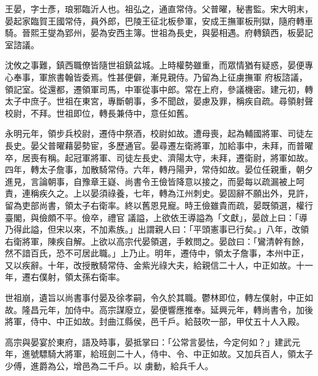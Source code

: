
\begin{pinyinscope}

 王晏，字士彥，琅邪臨沂人也。祖弘之，通直常侍。父普曜，秘書監。宋大明末，晏起家臨賀王國常侍，員外郎，巴陵王征北板參軍，安成王撫軍板刑獄，隨府轉車騎。晉熙王燮為郢州，晏為安西主簿。世祖為長史，與晏相遇。府轉鎮西，板晏記室諮議。



 沈攸之事難，鎮西職僚皆隨世祖鎮盆城。上時權勢雖重，而眾情猶有疑惑，晏便專心奉事，軍旅書翰皆委焉。性甚便僻，漸見親侍。乃留為上征虜撫軍
 府板諮議，領記室。從還都，遷領軍司馬，中軍從事中郎。常在上府，參議機密。建元初，轉太子中庶子。世祖在東宮，專斷朝事，多不聞啟，晏慮及罪，稱疾自疏。尋領射聲校尉，不拜。世祖即位，轉長兼侍中，意任如舊。



 永明元年，領步兵校尉，遷侍中祭酒，校尉如故。遭母喪，起為輔國將軍、司徒左長史。晏父普曜藉晏勢宦，多歷通官。晏尋遷左衛將軍，加給事中，未拜，而普曜卒，居喪有稱。起冠軍將軍、司徒左長史、濟陽太守，未拜，遷衛尉，將軍如故。四年，轉太子詹事，加散騎常侍。六年，轉丹陽尹，常侍如故。晏位任親重，朝夕進見，言論朝事，自豫章王嶷、尚書令王儉皆降意以接之，而晏每以疏漏被上呵責，連稱疾久之。上以晏須祿養，七年，轉為江州刺史。晏固辭不願出外，見許，留為吏部尚書，領太子右衛率。終以舊恩見寵。時王儉雖貴而疏，晏既領選，權行臺閣，與儉頗不平。儉卒，禮官
 議謚，上欲依王導謚為「文獻」，晏啟上曰：「導乃得此謚，但宋以來，不加素族。」出謂親人曰：「平頭憲事已行矣。」八年，改領右衛將軍，陳疾自解。上欲以高宗代晏領選，手敕問之。晏啟曰：「鸞清幹有餘，然不諳百氏，恐不可居此職。」上乃止。明年，遷侍中，領太子詹事，本州中正，又以疾辭。十年，改授散騎常侍、金紫光祿大夫，給親信二十人，中正如故。十一年，遷右僕射，領太孫右衛率。



 世祖崩，遺旨以尚書事付晏及徐孝嗣，令久於其職。鬱林即位，轉左僕射，中正如故。隆昌元年，加侍中。高宗謀廢立，晏便響應推奉。延興元年，轉尚書令，加後將軍，侍中、中正如故。封曲江縣侯，邑千戶。給鼓吹一部，甲仗五十人入殿。



 高宗與晏宴於東府，語及時事，晏抵掌曰：「公常言晏怯，今定何如？」建武元年，進號驃騎大將軍，給班劍二十人，侍中、令、中正如故。又加兵百人，領太子少傅，進爵為公，增邑為二千戶。以
 虜動，給兵千人。




\end{pinyinscope}
